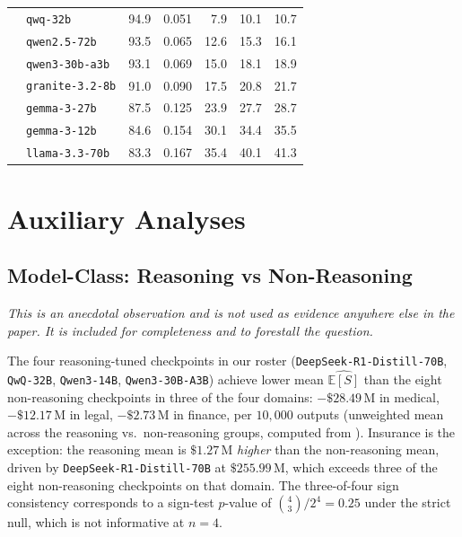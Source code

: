 \documentclass[11pt]{article}
\newcommand{\ES}{\mathbb{E}[S]}
\begin{document}
\begin{table}[t]
\begin{tabular}{@{}llrrrrr@{}}
  & \texttt{qwq-32b}                  & 94.9 & 0.051 &  7.9 & 10.1 & 10.7 \\
  & \texttt{qwen2.5-72b}              & 93.5 & 0.065 & 12.6 & 15.3 & 16.1 \\
  & \texttt{qwen3-30b-a3b}            & 93.1 & 0.069 & 15.0 & 18.1 & 18.9 \\
  & \texttt{granite-3.2-8b}           & 91.0 & 0.090 & 17.5 & 20.8 & 21.7 \\
  & \texttt{gemma-3-27b}              & 87.5 & 0.125 & 23.9 & 27.7 & 28.7 \\
  & \texttt{gemma-3-12b}              & 84.6 & 0.154 & 30.1 & 34.4 & 35.5 \\
  & \texttt{llama-3.3-70b}            & 83.3 & 0.167 & 35.4 & 40.1 & 41.3 \\
\bottomrule
\end{tabular}
\vspace{-1em}
\end{table}

\section{Auxiliary Analyses}
\label{sec:app-auxiliary}

\subsection{Model-Class: Reasoning vs Non-Reasoning}
\label{sec:app-model-class}

\emph{This is an anecdotal observation and is not used as
evidence anywhere else in the paper. It is included for
completeness and to forestall the question.}

The four reasoning-tuned checkpoints in our roster
(\texttt{DeepSeek-R1-Distill-70B}, \texttt{QwQ-32B}, \texttt{Qwen3-14B}, \texttt{Qwen3-30B-A3B})
achieve lower mean $\widehat{\ES}$ than the eight non-reasoning
checkpoints in three of the four domains: $-\$28.49$\,M in
medical, $-\$12.17$\,M in legal, $-\$2.73$\,M in finance, per
$10{,}000$ outputs (unweighted mean across the reasoning vs.\
non-reasoning groups, computed from
). Insurance is the
exception: the reasoning mean is $\$1.27$\,M \emph{higher} than
the non-reasoning mean, driven by \texttt{DeepSeek-R1-Distill-70B} at
$\$255.99$\,M, which exceeds three of the eight non-reasoning
checkpoints on that domain. The three-of-four sign consistency
corresponds to a sign-test $p$-value of $\binom{4}{3}/2^4=0.25$
under the strict null, which is not informative at $n=4$.
\end{document}
